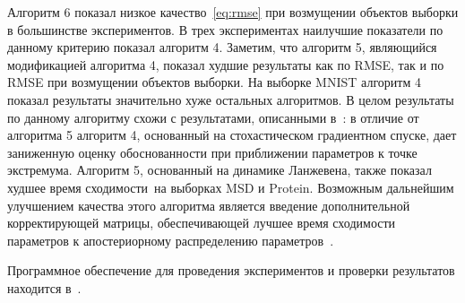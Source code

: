 Алгоритм 6 показал низкое качество~\eqref{eq:rmse} при возмущении объектов выборки {в большинстве экспериментов}. В {трех} экспериментах наилучшие показатели по данному критерию показал алгоритм 4. Заметим, что алгоритм 5, являющийся модификацией алгоритма 4, показал худшие результаты как по RMSE, так и по RMSE при возмущении объектов выборки. 
{На выборке MNIST алгоритм 4 показал результаты значительно хуже остальных алгоритмов. В целом результаты по данному алгоритму схожи с результатами, описанными в~\cite{early}: в отличие от алгоритма 5 алгоритм 4, основанный на стохастическом градиентном спуске, дает заниженную оценку обоснованности при приближении параметров к точке экстремума. } Алгоритм 5, основанный на динамике Ланжевена, также показал худшее время сходимости~{на выборках MSD и Protein}. Возможным дальнейшим улучшением качества этого алгоритма является введение дополнительной корректирующей матрицы, обеспечивающей лучшее время сходимости параметров к апостериорному распределению параметров~\cite{langevin}.

Программное обеспечение для проведения экспериментов и проверки результатов  находится в~\cite{my_src}. 











